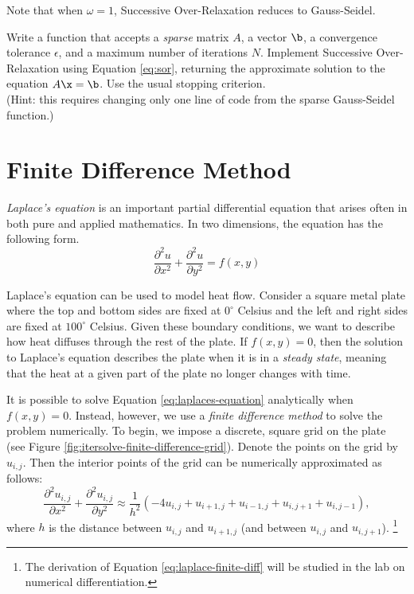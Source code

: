 Note that when $\omega = 1$, Successive Over-Relaxation reduces to Gauss-Seidel.

\begin{problem}
Write a function that accepts a \emph{sparse} matrix $A$, a vector $\b$, a convergence tolerance $\epsilon$, and a maximum number of iterations $N$.
Implement Successive Over-Relaxation using Equation \ref{eq:sor}, returning the approximate solution to the equation $A\x = \b$.
Use the usual stopping criterion.
\\(Hint: this requires changing only one line of code from the sparse Gauss-Seidel function.)
\label{prob:sor}
\end{problem}

\section*{Finite Difference Method} %

\emph{Laplace's equation} is an important partial differential equation that arises often in both pure and applied mathematics.
In two dimensions, the equation has the following form.
\begin{equation}
\frac{\partial^2 u}{\partial x^2} + \frac{\partial^2 u}{\partial y^2} = f(x,y)
\label{eq:laplaces-equation}
\end{equation}

Laplace's equation can be used to model heat flow.
Consider a square metal plate where the top and bottom sides are fixed at $0^\circ$ Celsius and the left and right sides are fixed at $100^\circ$ Celsius.
Given these boundary conditions, we want to describe how heat diffuses through the rest of the plate.
If $f(x,y)=0$, then the solution to Laplace's equation describes the plate when it is in a \emph{steady state}, meaning that the heat at a given part of the plate no longer changes with time.

It is possible to solve Equation \ref{eq:laplaces-equation} analytically when $f(x,y) = 0$.
Instead, however, we use a \emph{finite difference method} to solve the problem numerically.
To begin, we impose a discrete, square grid on the plate (see Figure \ref{fig:itersolve-finite-difference-grid}).
Denote the points on the grid by $u_{i,j}$.
Then the interior points of the grid can be numerically approximated as follows:
\begin{equation}
\frac{\partial^2 u_{i,j}}{\partial x^2}+ \frac{\partial^2 u_{i,j}}{\partial y^2}
\approx
\frac{1}{h^2}\left(-4u_{i,j} + u_{i+1,j} + u_{i-1,j} + u_{i,j+1} +  u_{i,j-1}\right),
\label{eq:laplace-finite-diff}
\end{equation}
where $h$ is the distance between $u_{i,j}$ and $u_{i+1,j}$ (and between $u_{i,j}$ and $u_{i,j+1}$).%
\footnote{The derivation of Equation \ref{eq:laplace-finite-diff} will be studied in the lab on numerical differentiation.}

